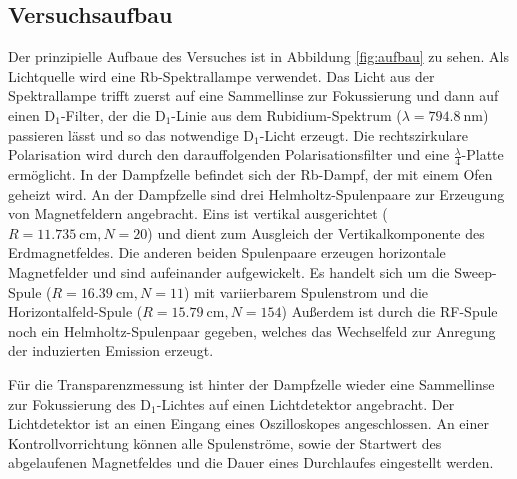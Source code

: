 \subsection{Versuchsaufbau}
\label{sec:Versuchsaufbau}

Der prinzipielle Aufbaue des Versuches ist in Abbildung \ref{fig:aufbau}
zu sehen.
Als Lichtquelle wird eine Rb-Spektrallampe verwendet.
Das Licht aus der Spektrallampe trifft zuerst auf eine Sammellinse
zur Fokussierung und dann auf einen 
D$_1$-Filter, der die D$_1$-Linie aus dem Rubidium-Spektrum 
($\lambda = \SI{794,8}{\nano\meter}$) passieren lässt und so das
notwendige D$_1$-Licht erzeugt. Die rechtszirkulare Polarisation
wird durch den darauffolgenden Polarisationsfilter und eine $\frac{\lambda}{4}$-Platte ermöglicht.
In der Dampfzelle befindet sich der Rb-Dampf, der mit einem Ofen geheizt
wird. An der Dampfzelle sind drei Helmholtz-Spulenpaare zur Erzeugung von 
Magnetfeldern angebracht. Eins ist vertikal ausgerichtet 
($R=\SI{11,735}{\centi\meter}, N=20$) und dient 
zum Ausgleich der Vertikalkomponente des Erdmagnetfeldes. 
Die anderen beiden Spulenpaare erzeugen horizontale Magnetfelder und sind
aufeinander aufgewickelt. Es handelt sich um die Sweep-Spule ($R=\SI{16,39}{\centi\meter}, N=11$) mit variierbarem Spulenstrom und die 
Horizontalfeld-Spule ($R=\SI{15,79}{\centi\meter}, N=154$)
Außerdem ist durch die RF-Spule noch ein Helmholtz-Spulenpaar gegeben, welches das 
Wechselfeld zur Anregung der induzierten Emission erzeugt.

Für die Transparenzmessung ist hinter der Dampfzelle wieder eine Sammellinse zur Fokussierung
des D$_1$-Lichtes auf einen Lichtdetektor angebracht. Der Lichtdetektor ist an einen Eingang
eines Oszilloskopes angeschlossen.
An einer Kontrollvorrichtung können alle Spulenströme, sowie der Startwert des abgelaufenen
Magnetfeldes und die Dauer eines Durchlaufes eingestellt werden.



